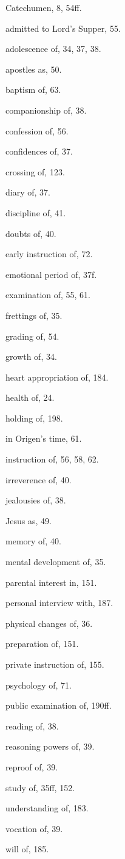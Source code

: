 \begin{originalinhalt}
Catechumen, 8, 54ff.

admitted to Lord’s Supper, 55.

adolescence of, 34, 37, 38.

apostles as, 50.

baptism of, 63.

companionship of, 38.

confession of, 56.

confidences of, 37.

crossing of, 123.

diary of, 37.

discipline of, 41.

doubts of, 40.

early instruction of, 72.

emotional period of, 37f.

examination of, 55, 61.

frettings of, 35.

grading of, 54.

growth of, 34.

heart appropriation of, 184.

health of, 24.

holding of, 198.

in Origen’s time, 61.

instruction of, 56, 58, 62.

irreverence of, 40.

jealousies of, 38.

Jesus as, 49.

memory of, 40.

mental development of, 35.

parental interest in, 151.

personal interview with, 187.

physical changes of, 36.

preparation of, 151.

private instruction of, 155.

psychology of, 71.

public examination of, 190ff.

reading of, 38.

reasoning powers of, 39.

reproof of, 39.

study of, 35ff, 152.

understanding of, 183.

vocation of, 39.

will of, 185.


\end{originalinhalt}

